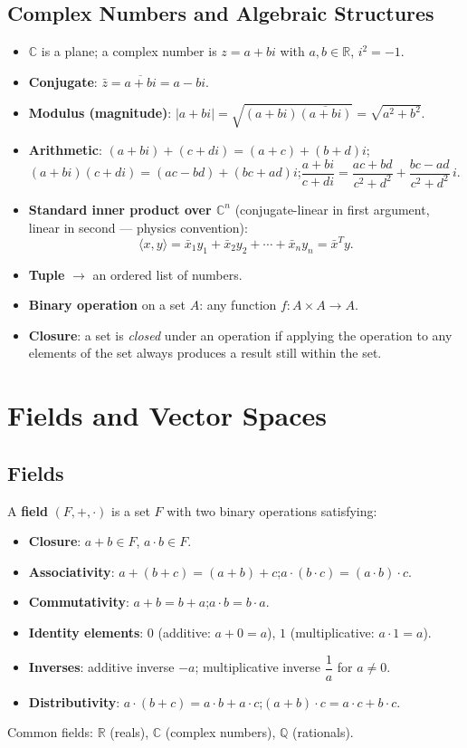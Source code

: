 \documentclass[hidelinks]{article}
\begin{document}
\subsection{Complex Numbers and Algebraic Structures}
\begin{itemize}
    \item $\mathbb{C}$ is a plane; a complex number is $z = a + bi$ with $a, b \in \mathbb{R}$, $i^2 = -1$.
    \item \textbf{Conjugate}: $\bar{z} = \overline{a+bi} = a - bi$.
    \item \textbf{Modulus (magnitude)}: $|a+bi| = \sqrt{(a+bi)\overline{(a+bi)}} = \sqrt{a^2+b^2}$.
    \item \textbf{Arithmetic}: $(a+bi)+(c+di) = (a+c)+(b+d)i$;\quad $(a+bi)(c+di) = (ac-bd)+(bc+ad)i$;\quad $\dfrac{a+bi}{c+di} = \dfrac{ac+bd}{c^2+d^2} + \dfrac{bc-ad}{c^2+d^2}\,i$.
    \item \textbf{Standard inner product over $\mathbb{C}^n$} (conjugate-linear in first argument, linear in second — physics convention):
    \[
        \langle x, y \rangle = \bar{x}_1 y_1 + \bar{x}_2 y_2 + \cdots + \bar{x}_n y_n = \bar{x}^T y.
    \]
    \item \textbf{Tuple} $\rightarrow$ an ordered list of numbers.
    \item \textbf{Binary operation} on a set $A$: any function $f : A \times A \rightarrow A$.
    \item \textbf{Closure}: a set is \emph{closed} under an operation if applying the operation to any elements of the set always produces a result still within the set.
\end{itemize}

\section{Fields and Vector Spaces}

\subsection{Fields}
A \textbf{field} $(F, +, \cdot)$ is a set $F$ with two binary operations satisfying:
\begin{itemize}
    \item \textbf{Closure}: $a+b \in F$,\; $a \cdot b \in F$.
    \item \textbf{Associativity}: $a+(b+c)=(a+b)+c$;\quad $a\cdot(b\cdot c)=(a\cdot b)\cdot c$.
    \item \textbf{Commutativity}: $a+b=b+a$;\quad $a\cdot b=b\cdot a$.
    \item \textbf{Identity elements}: $0$ (additive: $a+0=a$),\; $1$ (multiplicative: $a\cdot 1=a$).
    \item \textbf{Inverses}: additive inverse $-a$;\; multiplicative inverse $\dfrac{1}{a}$ for $a\neq 0$.
    \item \textbf{Distributivity}: $a\cdot(b+c)=a\cdot b+a\cdot c$;\quad $(a+b)\cdot c=a\cdot c+b\cdot c$.
\end{itemize}
Common fields: $\mathbb{R}$ (reals), $\mathbb{C}$ (complex numbers), $\mathbb{Q}$ (rationals).
\end{document}
